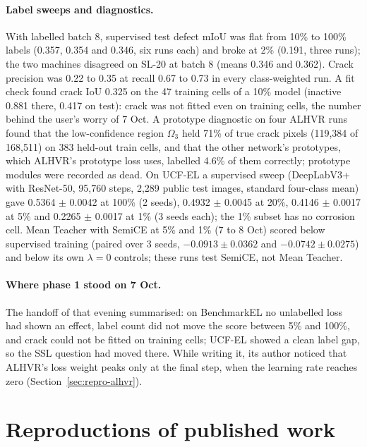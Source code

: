 \paragraph{Label sweeps and diagnostics.} With labelled batch 8, supervised test defect mIoU was flat from 10\% to 100\% labels (0.357,
0.354 and 0.346, six runs each) and broke at 2\% (0.191, three runs); the two machines disagreed on SL-20 at batch 8 (means 0.346 and
0.362). Crack precision was 0.22 to 0.35 at recall 0.67 to 0.73 in every class-weighted run. A fit check found crack IoU 0.325 on the
47 training cells of a 10\% model (inactive 0.881 there, 0.417 on test): crack was not fitted even on training cells, the number
behind the user's worry of 7 Oct. A prototype diagnostic on four ALHVR runs found that the low-confidence region $\Omega_3$ held 71\%
of true crack pixels (119,384 of 168,511) on 383 held-out train cells, and that the other network's prototypes, which ALHVR's
prototype loss uses, labelled 4.6\% of them correctly; prototype modules were recorded as dead. On UCF-EL a supervised sweep
(DeepLabV3+ \citep{chen2018deeplabv3plus} with ResNet-50, 95,760 steps, 2,289 public test images, standard four-class mean) gave
0.5364 $\pm$ 0.0042 at 100\% (2 seeds), 0.4932 $\pm$ 0.0045 at 20\%, 0.4146 $\pm$ 0.0017 at 5\% and 0.2265 $\pm$ 0.0017 at 1\% (3
seeds each); the 1\% subset has no corrosion cell. Mean Teacher with SemiCE at 5\% and 1\% (7 to 8 Oct) scored below supervised
training (paired over 3 seeds, $-0.0913 \pm 0.0362$ and $-0.0742 \pm 0.0275$) and below its own $\lambda = 0$ controls; these runs test
SemiCE, not Mean Teacher.

\paragraph{Where phase 1 stood on 7 Oct.} The handoff of that evening summarised: on BenchmarkEL no unlabelled loss had shown an
effect, label count did not move the score between 5\% and 100\%, and crack could not be fitted on training cells; UCF-EL showed a clean
label gap, so the SSL question had moved there. While writing it, its author noticed that ALHVR's loss weight peaks only at the final
step, when the learning rate reaches zero (Section~\ref{sec:repro-alhvr}).

\section{Reproductions of published work}\label{sec:repro-papers}

